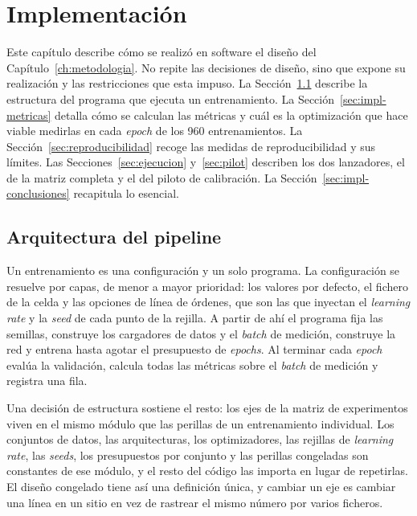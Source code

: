 \chapter{Implementación}
\label{ch:implementacion}

Este capítulo describe cómo se realizó en software el diseño del Capítulo~\ref{ch:metodologia}. No repite las decisiones de diseño, sino que expone su realización y las restricciones que esta impuso. La Sección~\ref{sec:pipeline} describe la estructura del programa que ejecuta un entrenamiento. La Sección~\ref{sec:impl-metricas} detalla cómo se calculan las métricas y cuál es la optimización que hace viable medirlas en cada \emph{epoch} de los 960 entrenamientos. La Sección~\ref{sec:reproducibilidad} recoge las medidas de reproducibilidad y sus límites. Las Secciones~\ref{sec:ejecucion} y~\ref{sec:pilot} describen los dos lanzadores, el de la matriz completa y el del piloto de calibración. La Sección~\ref{sec:impl-conclusiones} recapitula lo esencial.

\section{Arquitectura del pipeline}
\label{sec:pipeline}

Un entrenamiento es una configuración y un solo programa. La configuración se resuelve por capas, de menor a mayor prioridad: los valores por defecto, el fichero de la celda y las opciones de línea de órdenes, que son las que inyectan el \emph{learning rate} y la \emph{seed} de cada punto de la rejilla. A partir de ahí el programa fija las semillas, construye los cargadores de datos y el \emph{batch} de medición, construye la red y entrena hasta agotar el presupuesto de \emph{epochs}. Al terminar cada \emph{epoch} evalúa la validación, calcula todas las métricas sobre el \emph{batch} de medición y registra una fila.

Una decisión de estructura sostiene el resto: los ejes de la matriz de experimentos viven en el mismo módulo que las perillas de un entrenamiento individual. Los conjuntos de datos, las arquitecturas, los optimizadores, las rejillas de \emph{learning rate}, las \emph{seeds}, los presupuestos por conjunto y las perillas congeladas son constantes de ese módulo, y el resto del código las importa en lugar de repetirlas. El diseño congelado tiene así una definición única, y cambiar un eje es cambiar una línea en un sitio en vez de rastrear el mismo número por varios ficheros.

